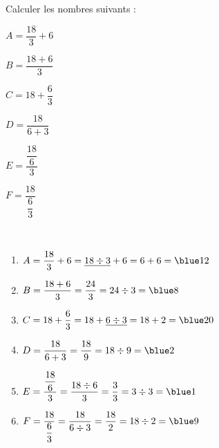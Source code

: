 \begin{exercice} %
   Calculer les nombres suivants :
   \setlength{\columnseprule}{0pt}
   \begin{multicols}{2}
      \begin{list}{}{}
         \item $A=\dfrac{18}{3}+6$
         \item $B=\dfrac{18+6}{3}$         
         \item $C=18+\dfrac{6}{3}$
         \columnbreak
         \item $D=\dfrac{18}{6+3}$         
         \item $E=\dfrac{\dfrac{18}{6}}{3}$
         \item $F=\dfrac{18}{\dfrac{6}{3}}$
      \end{list}
   \end{multicols}
 \end{exercice}
 
 \begin{corrige}
    \ \\ [-5mm]
    \begin{enumerate}
       \item $A=\dfrac{18}{3}+6 =\underline{18\div3}+6 =6+6 =\blue 12$ \medskip
       \item $B=\dfrac{18+6}{3} =\dfrac{24}{3} =24\div3 =\blue 8$ \medskip
       \item $C=18+\dfrac{6}{3} =18+\underline{6\div3} =18+2 =\blue 20$ \medskip
       \item $D=\dfrac{18}{6+3} =\dfrac{18}{9} =18\div9 =\blue 2$ \medskip
       \item $E=\dfrac{\dfrac{18}{6}}{3} =\dfrac{18\div6}{3} =\dfrac{3}{3} =3\div3 =\blue 1$ \medskip
       \item $F=\dfrac{18}{\dfrac{6}{3}} =\dfrac{18}{6\div3} =\dfrac{18}{2} =18\div2 =\blue 9$
    \end{enumerate}
 \end{corrige}